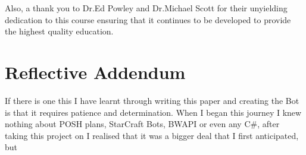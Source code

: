 \documentclass[journal]{IEEEtran}
\begin{document}
	Also, a thank you to Dr.Ed Powley and Dr.Michael Scott for their unyielding dedication to this course ensuring that it continues to be developed to provide the highest quality education.
	
	
	
	
	\section{Reflective Addendum}
	If there is one this I have learnt through writing this paper and creating the Bot is that it requires patience and determination. When I began this journey I knew nothing about POSH plans, StarCraft Bots, BWAPI or even any C\#, after taking this project on I realised that it was a bigger deal that I first anticipated, but 
	
\end{document}
